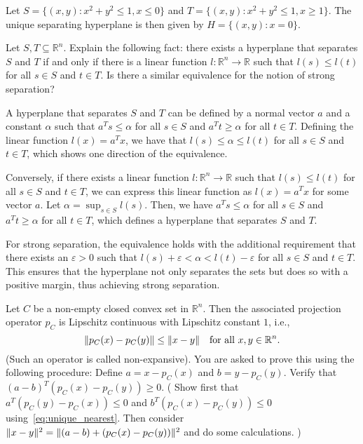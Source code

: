 \begin{solution}
  Let $S = \{ (x, y) : x^2 + y^2 \leq 1, x \leq 0 \}$ and $T = \{ (x, y) : x^2 + y^2 \leq 1, x \geq 1 \}$.
  The unique separating hyperplane is then given by $H = \{ (x, y) : x = 0 \}$.
\end{solution}

\begin{exercise}
  Let $S,T \subseteq \mathbb{R}^n$.
  Explain the following fact: there exists a hyperplane that separates $S$ and $T$ if and only if there is a linear function $l: \mathbb{R}^n \to \mathbb{R}$ such that $l(s) \leq l(t)$ for all $s \in S$ and $t \in T$.
  Is there a similar equivalence for the notion of strong separation?
\end{exercise}

\begin{solution}
  A hyperplane that separates $S$ and $T$ can be defined by a normal vector $a$ and a constant $\alpha$ such that $a^T s \leq \alpha$ for all $s \in S$ and $a^T t \geq \alpha$ for all $t \in T$.
  Defining the linear function $l(x) = a^T x$, we have that $l(s) \leq \alpha \leq l(t)$ for all $s \in S$ and $t \in T$, which shows one direction of the equivalence.

  Conversely, if there exists a linear function $l: \mathbb{R}^n \to \mathbb{R}$ such that $l(s) \leq l(t)$ for all $s \in S$ and $t \in T$, we can express this linear function as $l(x) = a^T x$ for some vector $a$.
  Let $\alpha = \sup_{s \in S} l(s)$.
  Then, we have $a^T s \leq \alpha$ for all $s \in S$ and $a^T t \geq \alpha$ for all $t \in T$, which defines a hyperplane that separates $S$ and $T$.

  For strong separation, the equivalence holds with the additional requirement that there exists an $\varepsilon > 0$ such that $l(s) + \varepsilon < \alpha < l(t) - \varepsilon$ for all $s \in S$ and $t \in T$.
  This ensures that the hyperplane not only separates the sets but does so with a positive margin, thus achieving strong separation.
\end{solution}

\begin{exercise}
  Let $C$ be a non-empty closed convex set in $\mathbb{R}^n$.
  Then the associated projection operator $p_C$ is Lipschitz continuous with Lipschitz constant $1$, i.e.,
  \begin{equation}
    \norm*{p_C(x) - p_C(y)} \leq \norm{x - y} \quad \text{for all } x, y \in \mathbb{R}^n.
  \end{equation}
  (Such an operator is called non-expansive).
  You are asked to prove this using the following procedure:
  Define $a = x - p_C(x)$ and $b = y - p_C(y)$.
  Verify that $(a - b)^T (p_C(x) - p_C(y)) \geq 0$.
  (%
    Show first that $a^T (p_C(y) - p_C(x)) \leq 0$ and $b^T (p_C(x) - p_C(y)) \leq 0$ using~\eqref{eq:unique_nearest}.
    Then consider $\norm{x - y}^2 = \norm{(a - b) + (p_C(x) - p_C(y))}^2$ and do some calculations.%
  )
\end{exercise}

